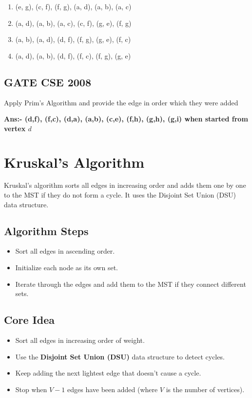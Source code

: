 \documentclass[a4paper,14pt]{extarticle}
\begin{document}
\begin{enumerate}[label=(\alph*)]
    \item (e, g), (c, f), (f, g), (a, d), (a, b), (a, c)
    \item (a, d), (a, b), (a, c), (c, f), (g, e), (f, g)
    \item (a, b), (a, d), (d, f), (f, g), (g, e), (f, c)
    \item (a, d), (a, b), (d, f), (f, c), (f, g), (g, e)
\end{enumerate}


\subsection{GATE CSE 2008}
Apply Prim's Algorithm and provide the edge in order which they were added



\textbf{Ans:- (d,f), (f,c), (d,a), (a,b), (c,e), (f,h), (g,h), (g,i) when started from vertex $d$}

\newpage
\section{Kruskal's Algorithm} 

Kruskal's\cite{kruskal1956} algorithm sorts all edges in increasing order and adds them one by one to the MST if 
they do not form a cycle. It uses the Disjoint Set Union (DSU\cite{tarjan1975}) data structure.

\subsection{Algorithm Steps}
\begin{itemize}
    \item Sort all edges in ascending order.
    \item Initialize each node as its own set.
    \item Iterate through the edges and add them to the MST if they connect different sets.
\end{itemize}

\subsection{Core Idea}
\begin{itemize}
    \item Sort all edges in increasing order of weight.
    \item Use the \textbf{Disjoint Set Union (DSU)} data structure to detect cycles.
    \item Keep adding the next lightest edge that doesn't cause a cycle.
    \item Stop when \(V-1\) edges have been added (where \(V\) is the number of vertices).
\end{itemize}
\end{document}
